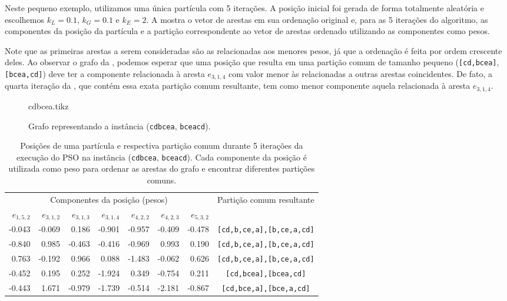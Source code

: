    Neste pequeno exemplo, utilizamos uma única partícula com 5 iterações. A posição inicial foi gerada de forma totalmente aleatória e escolhemos $k_L = 0.1$, $k_G = 0.1$ e $k_E = 2$. A  mostra o vetor de arestas em sua ordenação original e, para as 5 iterações do algoritmo, as componentes da posição da partícula e a partição correspondente ao vetor de arestas ordenado utilizando as componentes como pesos.

    Note que as primeiras arestas a serem consideradas são as relacionadas aos menores pesos, já que a ordenação é feita por ordem crescente deles. Ao observar o grafo da , podemos esperar que uma posição que resulta em uma partição comum de tamanho pequeno (\texttt{[cd,bcea]}, \texttt{[bcea,cd]}) deve ter a componente relacionada à aresta $e_{3,1,4}$ com valor menor às relacionadas a outras arestas coincidentes. De fato, a quarta iteração da , que contém essa exata partição comum resultante, tem como menor componente aquela relacionada à aresta $e_{3,1,4}$.

    \begin{figure}[htb]
        \centering
        {cdbcea.tikz}

        \caption{Grafo representando a instância (\texttt{cdbcea}, \texttt{bceacd}).}
        \label{fig:grafo-pso}
    \end{figure}

    \begin{table}[htb]
        \centering
        \begin{tabular}{rrrrrrr|c}
            \toprule
            \multicolumn{7}{c|}{Componentes da posição (pesos)} & \multirow{2}{*}{Partição comum resultante} \\
            $e_{1,5,2}$ & $e_{3,1,2}$ & $e_{3,1,3}$ & $e_{3,1,4}$ & $e_{4,2,2}$ & $e_{4,2,3}$ & $e_{5,3,2}$ & \\
            \midrule
            -0.043 & -0.069 & 0.186 & -0.901 & -0.957 & -0.409 & -0.478 & \texttt{[cd,b,ce,a],[b,ce,a,cd]} \\
            -0.840 & 0.985 & -0.463 & -0.416 & -0.969 & 0.993 & 0.190 & \texttt{[cd,b,ce,a],[b,ce,a,cd]} \\
            0.763 & -0.192 & 0.966 & 0.088 & -1.483 & -0.062 & 0.626 & \texttt{[cd,b,ce,a],[b,ce,a,cd]} \\
            -0.452 & 0.195 & 0.252 & -1.924 & 0.349 & -0.754 & 0.211 & \texttt{[cd,bcea],[bcea,cd]} \\
            -0.443 & 1.671 & -0.979 & -1.739 & -0.514 & -2.181 & -0.867 & \texttt{[cd,bce,a],[bce,a,cd]} \\
            \bottomrule
        \end{tabular}

        \caption{Posições de uma partícula e respectiva partição comum durante 5 iterações da execução do PSO na instância (\texttt{cdbcea}, \texttt{bceacd}). Cada componente da posição é utilizada como peso para ordenar as arestas do grafo e encontrar diferentes partições comuns.}
        \label{tab:pso-ex}
    \end{table}
